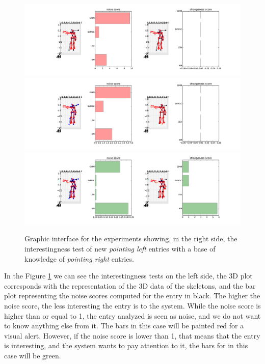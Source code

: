 \begin{figure}[h]
\includegraphics[width=15cm]{Figures/results_imp/right_vs_left1}
\includegraphics[width=15cm]{Figures/results_imp/right_vs_left2}
\includegraphics[width=15cm]{Figures/results_imp/right_vs_left3}
\centering
\caption[Graphic interface]{Graphic interface for the experiments showing, in the right side, the interestingness test of new \emph{pointing left} entries with a base of knowledge of \emph{pointing right} entries. \label{fig:graphic}}
\end{figure}

In the Figure \ref{fig:graphic} we can see the interestingness tests on the left side, the 3D plot corresponds with the representation of the 3D data of the skeletons, and the bar plot representing the noise scores computed for the entry in black. The higher the noise score, the less interesting the entry is to the system. While the noise score is higher than or equal to 1, the entry analyzed is seen as noise, and we do not want to know anything else from it. The bars in this case will be painted red for a visual alert. However, if the noise score is lower than 1, that means that the entry is interesting, and the system wants to pay attention to it, the bars for in this case will be green. 

